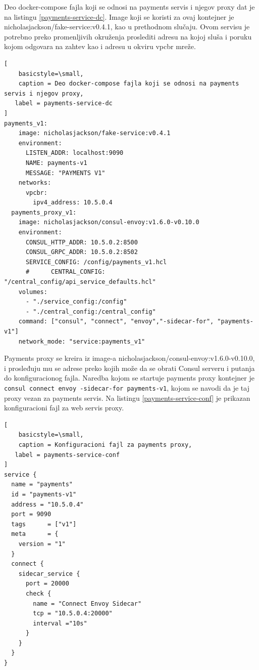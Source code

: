 \documentclass[a4paper,12pt]{report}
\begin{document}
Deo docker-compose fajla koji se odnosi na payments servis i njegov proxy dat je na listingu \ref{payments-service-dc}. Image koji se koristi za ovaj kontejner je nicholasjackson/fake-service:v0.4.1, kao u prethodnom slučaju. Ovom servisu je potrebno preko promenljivih okruženja proslediti adresu na kojoj sluša i poruku kojom odgovara na zahtev kao i adresu u okviru vpcbr mreže. \newline

\begin{lstlisting}[
    basicstyle=\small,
    caption = Deo docker-compose fajla koji se odnosi na payments servis i njegov proxy, 
   label = payments-service-dc
]
payments_v1:
    image: nicholasjackson/fake-service:v0.4.1
    environment:
      LISTEN_ADDR: localhost:9090
      NAME: payments-v1
      MESSAGE: "PAYMENTS V1"
    networks:
      vpcbr:
        ipv4_address: 10.5.0.4
  payments_proxy_v1:
    image: nicholasjackson/consul-envoy:v1.6.0-v0.10.0
    environment:
      CONSUL_HTTP_ADDR: 10.5.0.2:8500
      CONSUL_GRPC_ADDR: 10.5.0.2:8502
      SERVICE_CONFIG: /config/payments_v1.hcl
      #      CENTRAL_CONFIG: "/central_config/api_service_defaults.hcl"
    volumes:
      - "./service_config:/config"
      - "./central_config:/central_config"
    command: ["consul", "connect", "envoy","-sidecar-for", "payments-v1"]
    network_mode: "service:payments_v1"
\end{lstlisting}

Payments proxy se kreira iz image-a nicholasjackson/consul-envoy:v1.6.0-v0.10.0, i prosleđuju mu se adrese preko kojih može da se obrati Consul serveru i putanja do konfiguracionog fajla. Naredba kojom se startuje payments proxy kontejner je \texttt{consul connect envoy -sidecar-for payments-v1}, kojom se navodi da je taj proxy vezan za payments servis. Na listingu \ref{payments-service-conf} je prikazan konfiguracioni fajl za web servis proxy. \newline


\begin{lstlisting}[
    basicstyle=\small,
    caption = Konfiguracioni fajl za payments proxy, 
   label = payments-service-conf
]
service {
  name = "payments"
  id = "payments-v1"
  address = "10.5.0.4"
  port = 9090
  tags      = ["v1"]
  meta      = {
    version = "1"
  }
  connect { 
    sidecar_service {
      port = 20000
      check {
        name = "Connect Envoy Sidecar"
        tcp = "10.5.0.4:20000"
        interval ="10s"
      }
    }  
  }
}

\end{lstlisting}
\end{document}
